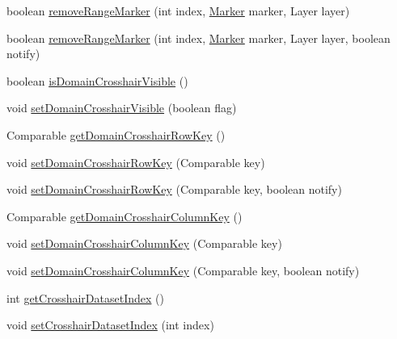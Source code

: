 \begin{DoxyCompactItemize}
\item 
boolean \mbox{\hyperlink{classorg_1_1jfree_1_1chart_1_1plot_1_1_category_plot_a293cfdd6b99805f122432bfc93a4d3f9}{remove\+Range\+Marker}} (int index, \mbox{\hyperlink{classorg_1_1jfree_1_1chart_1_1plot_1_1_marker}{Marker}} marker, Layer layer)
\item 
boolean \mbox{\hyperlink{classorg_1_1jfree_1_1chart_1_1plot_1_1_category_plot_af524ad5f9e33c115855b08dcca9e63d5}{remove\+Range\+Marker}} (int index, \mbox{\hyperlink{classorg_1_1jfree_1_1chart_1_1plot_1_1_marker}{Marker}} marker, Layer layer, boolean notify)
\item 
boolean \mbox{\hyperlink{classorg_1_1jfree_1_1chart_1_1plot_1_1_category_plot_ac2a9090ae1a302480897d3383773b168}{is\+Domain\+Crosshair\+Visible}} ()
\item 
void \mbox{\hyperlink{classorg_1_1jfree_1_1chart_1_1plot_1_1_category_plot_a2ab9eb722c31a8c3b1c179097cde043f}{set\+Domain\+Crosshair\+Visible}} (boolean flag)
\item 
Comparable \mbox{\hyperlink{classorg_1_1jfree_1_1chart_1_1plot_1_1_category_plot_a653b0c41af90cc1c634ae786e28d0a62}{get\+Domain\+Crosshair\+Row\+Key}} ()
\item 
void \mbox{\hyperlink{classorg_1_1jfree_1_1chart_1_1plot_1_1_category_plot_a0c603c55e35ebdbf75f4172dbe200d36}{set\+Domain\+Crosshair\+Row\+Key}} (Comparable key)
\item 
void \mbox{\hyperlink{classorg_1_1jfree_1_1chart_1_1plot_1_1_category_plot_a61fa16e803ce307b541cea73820fd4b6}{set\+Domain\+Crosshair\+Row\+Key}} (Comparable key, boolean notify)
\item 
Comparable \mbox{\hyperlink{classorg_1_1jfree_1_1chart_1_1plot_1_1_category_plot_aa65be33106869b4e0d40960b84bb110e}{get\+Domain\+Crosshair\+Column\+Key}} ()
\item 
void \mbox{\hyperlink{classorg_1_1jfree_1_1chart_1_1plot_1_1_category_plot_a729897971208ed8205332eac1e5dabff}{set\+Domain\+Crosshair\+Column\+Key}} (Comparable key)
\item 
void \mbox{\hyperlink{classorg_1_1jfree_1_1chart_1_1plot_1_1_category_plot_a0a34eb3097a0fefb182674f3be233450}{set\+Domain\+Crosshair\+Column\+Key}} (Comparable key, boolean notify)
\item 
int \mbox{\hyperlink{classorg_1_1jfree_1_1chart_1_1plot_1_1_category_plot_ad4daaf3bde6575397d2f2969bc9e73cd}{get\+Crosshair\+Dataset\+Index}} ()
\item 
void \mbox{\hyperlink{classorg_1_1jfree_1_1chart_1_1plot_1_1_category_plot_ab08947ce94aa16fbce3bca12a55e0b42}{set\+Crosshair\+Dataset\+Index}} (int index)

\end{DoxyCompactItemize}
